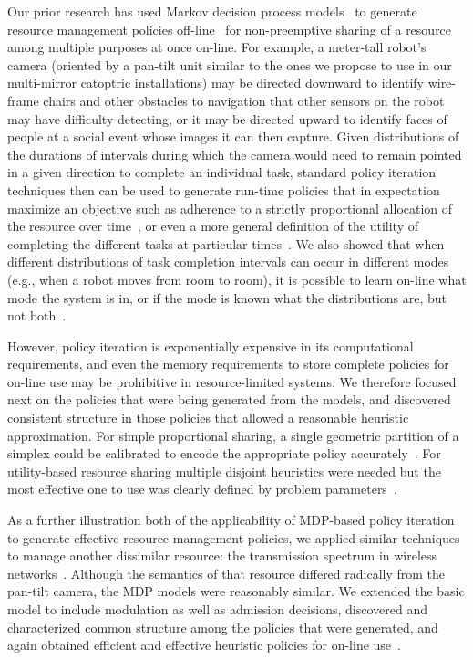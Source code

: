 Our prior research has used Markov decision process
models~\cite{gtsg08} to generate resource management policies
off-line~\cite{gtgs09} for non-preemptive sharing of a resource
among multiple purposes at once on-line.  For example, a meter-tall robot's
camera (oriented by a pan-tilt unit similar to the ones we propose to
use in our multi-mirror catoptric installations) may be directed
downward to identify wire-frame chairs and other obstacles to
navigation that other sensors on the robot may have difficulty
detecting, or it may be directed upward to identify faces of people at
a social event whose images it can then capture. Given distributions of
the durations of intervals during which the camera would need to
remain pointed in a given direction to complete an individual task,
standard policy iteration techniques then can be used to generate
run-time policies that in expectation maximize an objective such as
adherence to a strictly proportional allocation of the resource over
time~\cite{gtsg08}, or even a more general definition of the utility 
of completing the different tasks at particular times~\cite{tggs10}.
We also showed that when different distributions of task completion
intervals can occur in different modes (e.g., when a robot moves
from room to room), it is possible to learn on-line what mode
the system is in, or if the mode is known what the distributions are,
but not both~\cite{gtgsuai10}.

However, policy iteration is exponentially expensive in its computational
requirements, and even the memory requirements to store complete policies 
for on-line use may be prohibitive in resource-limited systems.  We 
therefore focused next on the policies that were being generated from 
the models, and discovered consistent structure in those policies that 
allowed a reasonable heuristic approximation.  For simple proportional 
sharing, a single geometric partition of a simplex could be calibrated 
to encode the appropriate policy accurately~\cite{gtspmgs10}.
For utility-based resource sharing multiple disjoint heuristics were needed but
the most effective one to use was clearly defined by problem parameters~\cite{tblwgs11}.

As a further illustration both of the applicability of MDP-based
policy iteration to generate effective resource management policies,
we applied similar techniques to manage another dissimilar resource: 
the transmission spectrum in wireless networks~\cite{mskgct13}.  
Although the semantics of that resource differed radically from the pan-tilt camera, 
the MDP models were reasonably similar.  We extended the basic model to
include modulation as well as admission decisions, discovered and characterized
common structure among the policies that were generated, and again obtained
efficient and effective heuristic policies for on-line use~\cite{mgc16}.

